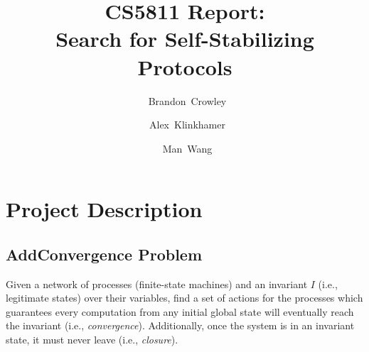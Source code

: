 


\usepackage{tikz}
\usetikzlibrary{arrows}

\usepackage{float}

\usepackage{algorithm}
\usepackage{algorithmic}

\setlength{\abovedisplayskip}{0.5em}
\setlength{\abovedisplayshortskip}{0.5em}
\setlength{\belowdisplayskip}{0.5em}
\setlength{\belowdisplayshortskip}{0.5em}
\setlength{\abovecaptionskip}{0.0em}
\setlength{\belowcaptionskip}{0.0em}

\def\imagetop#1{\vtop{\null\hbox{#1}}}

\newcommand{\xnsysinst}[3]{%
\begin{figure}[H]
\begin{tabular}[c]{l|l}
 \imagetop{#2} &
 \imagetop{\begin{tabular}[c]{@{}l@{}}#3\end{tabular}} \\
\end{tabular}
\caption{Problem instance: \texttt{#1}}
\end{figure}}

\newcommand{\unique}{\exists!}


\title{
 CS5811 Report:\\
 Search for Self-Stabilizing Protocols
}

\author{~Brandon~Crowley\and~Alex~Klinkhamer\and~Man~Wang}
\maketitle

\newpage
\tableofcontents
\newpage

\section{Project Description}

\subsection{AddConvergence Problem}

Given a network of processes (finite-state machines) and an invariant $I$ (i.e., legitimate states) over their variables, find a set of actions for the processes which guarantees every computation from any initial global state will eventually reach the invariant (i.e., {\it convergence}).
Additionally, once the system is in an invariant state, it must never leave (i.e., {\it closure}).


